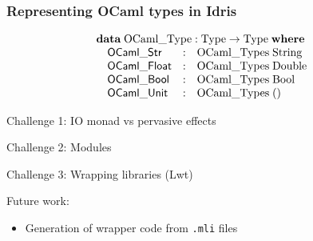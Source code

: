 \documentclass[aspectratio=169]{beamer}
\begin{document}
\begin{frame}[t]
  \frametitle{Representing OCaml types in Idris}

  \begin{displaymath}
    \begin{array}{@{}l}
      \textbf{data}\;\mathrm{OCaml\_Type} : \mathrm{Type} \to \mathrm{Type}\;\textbf{where} \\
      \quad
      \begin{array}{@{}l@{\quad:\quad}l}
        \mathsf{OCaml\_Str}   & \mathrm{OCaml\_Types}\;\mathrm{String} \\
        \mathsf{OCaml\_Float} & \mathrm{OCaml\_Types}\;\mathrm{Double} \\
        \mathsf{OCaml\_Bool}  & \mathrm{OCaml\_Types}\;\mathrm{Bool}   \\
        \mathsf{OCaml\_Unit}  & \mathrm{OCaml\_Types}\;()              \\
      \end{array}
    \end{array}
  \end{displaymath}

\end{frame}

\begin{frame}
  Challenge 1: IO monad vs pervasive effects
\end{frame}

\begin{frame}
  Challenge 2: Modules
\end{frame}

\begin{frame}
  Challenge 3: Wrapping libraries (Lwt)
\end{frame}


\begin{frame}
  Future work:
  \begin{itemize}
    \item Generation of wrapper code from \texttt{.mli} files
  \end{itemize}
\end{frame}
\end{document}
